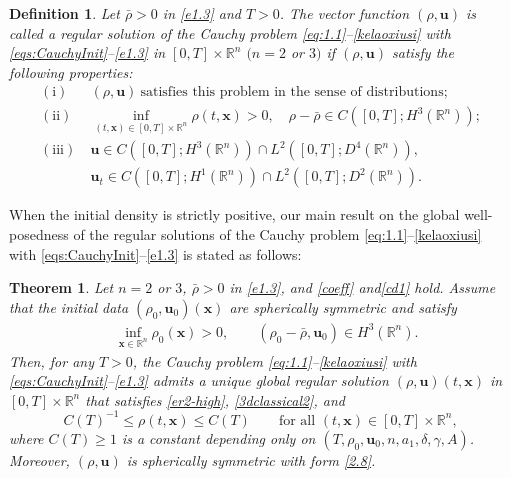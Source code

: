 \documentclass[11pt,reqno]{amsart}
\newtheorem{mydef}{Definition}
\newtheorem{thm}{Theorem}[section]
\numberwithin{rk}{section}
\numberwithin{prop}{section}
\numberwithin{mydef}{section}
\numberwithin{lem}{section}
\numberwithin{equation}{section}
\numberwithin{thm}{section}
\begin{document}
\begin{mydef}\label{cjk-po}
Let  $\bar\rho>0$ in \eqref{e1.3} and $T>0$. 
The vector function $(\rho, \boldsymbol{u})$ is called a regular solution of the Cauchy problem \eqref{eq:1.1}{\rm--}\eqref{kelaoxiusi} with \eqref{eqs:CauchyInit}{\rm--}\eqref{e1.3}  in $[0,T]\times \mathbb{R}^n$ $(n=2$ or $3)$ if $(\rho,\boldsymbol{u})$ satisfy the following properties{\rm:}
\begin{equation*}\begin{aligned}
\mathrm{(i)}& \ (\rho, \boldsymbol{u}) \ \text{satisfies this problem in the sense of distributions};\\
\mathrm{(ii)}& \ 
\inf_{(t,\boldsymbol{x})\in [0,T]\times\mathbb{R}^n} \rho(t,\boldsymbol{x})>0,\quad  
\rho-\bar\rho\in C([0,T];H^3(\mathbb{R}^n));\\[2pt]
\mathrm{(iii)}& \ \boldsymbol{u}\in C([0,T]; H^3(\mathbb{R}^n))\cap L^2([0,T]; D^{4}(\mathbb{R}^n)),\\[2pt]
& \ \boldsymbol{u}_t\in C([0,T]; H^{1}(\mathbb{R}^n))\cap L^2([0,T]; D^{2}(\mathbb{R}^n)).
\end{aligned}
\end{equation*}
\end{mydef}

When the initial density is strictly positive, our main result on the global well-posedness 
of the  regular solutions of the Cauchy problem \eqref{eq:1.1}--\eqref{kelaoxiusi} with \eqref{eqs:CauchyInit}--\eqref{e1.3} is  stated as follows:
\begin{thm}\label{thm-positive}
Let $n=2$ or $3$, $\bar\rho>0$ in \eqref{e1.3}, and
\eqref{coeff} and\eqref{cd1} hold. Assume that the initial data  $(\rho_0, \boldsymbol{u}_0)(\boldsymbol{x})$ are spherically symmetric and satisfy 
\begin{equation}\label{id1-high-positive}
\begin{aligned}
&\inf_{\boldsymbol{x}\in \mathbb{R}^n}\rho_0(\boldsymbol{x})>0,\qquad (\rho_0-\bar\rho,\boldsymbol{u}_0) \in H^3(\mathbb{R}^n). 
\end{aligned}
\end{equation}
Then, for any $T>0$,  the Cauchy problem \eqref{eq:1.1}{\rm--}\eqref{kelaoxiusi} with \eqref{eqs:CauchyInit}{\rm--}\eqref{e1.3}  admits a unique global regular solution $(\rho,\boldsymbol{u})(t,\boldsymbol{x})$
in $[0,T]\times\mathbb{R}^n$ that satisfies \eqref{er2-high}, \eqref{3dclassical2}, and \begin{equation}\label{decay-est-positive}
C(T)^{-1}\leq \rho(t,\boldsymbol{x})\leq C(T) \qquad \text{for all $(t,\boldsymbol{x})\in [0,T]\times \mathbb{R}^n$},
\end{equation}
where $C(T)\geq 1$ is a constant depending only on $(T,\rho_0,\boldsymbol{u}_0,n,a_1,\delta,\gamma,A)$. Moreover, $(\rho, \boldsymbol{u})$ is spherically symmetric with form \eqref{2.8}.
\end{thm}
\end{document}
